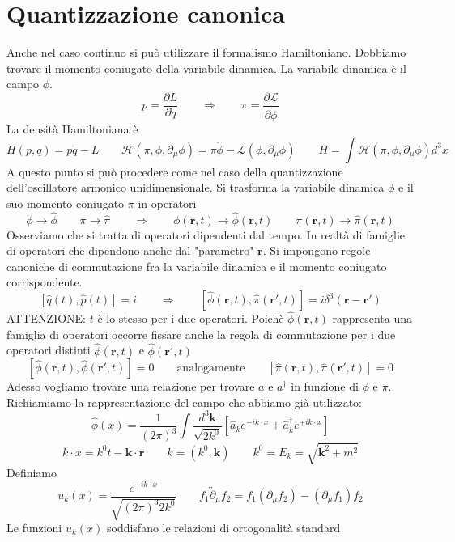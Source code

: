 \section{Quantizzazione canonica}
Anche nel caso continuo si può utilizzare il formalismo Hamiltoniano. Dobbiamo trovare il momento coniugato della variabile dinamica. La variabile dinamica è il campo $\phi$.
$$
p = \frac{\partial L}{\partial \dot{q}} \qquad \Longrightarrow \qquad \pi = \frac{\partial \mathcal{L}}{\partial \dot{\phi}}
$$
La densità Hamiltoniana è
$$
H(p,q) = p\dot{q} - L \qquad \mathcal{H}(\pi, \phi, \partial_\mu \phi) = \pi\dot{\phi} - \mathcal{L}(\phi, \partial_\mu \phi) \qquad H = \int \mathcal{H}(\pi, \phi, \partial_\mu \phi) d^3x
$$
A questo punto si può procedere come nel caso della quantizzazione dell'oscillatore armonico unidimensionale. Si trasforma la variabile dinamica $\phi$ e il suo momento coniugato $\pi$ in operatori
$$
\phi \to \hat{\phi} \qquad \pi \to \hat{\pi} \qquad \Longrightarrow \qquad \phi(\mathbf{r}, t) \to \hat{\phi}(\mathbf{r}, t) \qquad \pi(\mathbf{r}, t) \to \hat{\pi}(\mathbf{r}, t)
$$
Osserviamo che si tratta di operatori dipendenti dal tempo. In realtà di famiglie di operatori che dipendono anche dal "parametro" $\mathbf{r}$. Si impongono regole canoniche di commutazione fra la variabile dinamica e il momento coniugato corrispondente.
$$
[\hat{q}(t), \hat{p}(t)] = i \qquad \Longrightarrow \qquad [\hat{\phi}(\mathbf{r}, t), \hat{\pi}(\mathbf{r}', t)] = i\delta^3(\mathbf{r} - \mathbf{r}')
$$
ATTENZIONE: $t$ è lo stesso per i due operatori. Poichè $\hat{\phi}(\mathbf{r},t)$ rappresenta una famiglia di operatori occorre fissare anche la regola di commutazione per i due operatori distinti $\hat{\phi}(\mathbf{r},t)$ e $\hat{\phi}(\mathbf{r}',t)$
$$
[\hat{\phi}(\mathbf{r}, t), \hat{\phi}(\mathbf{r}', t)] = 0 \qquad \text{analogamente}\qquad [\hat{\pi}(\mathbf{r}, t), \hat{\pi}(\mathbf{r}', t)] = 0
$$
Adesso vogliamo trovare una relazione per trovare $a$ e $a^\dagger$ in funzione di $\phi$ e $\pi$. Richiamiamo la rappresentazione del campo che abbiamo già utilizzato:
$$
\hat{\phi}(x) = \frac{1}{(2\pi)^3} \int \frac{d^3\mathbf{k}}{\sqrt{2k^0}} [\hat{a}_k e^{-ik\cdot x} + \hat{a}_k^\dagger e^{+ik\cdot x}]
$$
$$
k \cdot x = k^0 t - \mathbf{k} \cdot \mathbf{r} \qquad k = (k^0, \mathbf{k}) \qquad k^0 = E_k = \sqrt{\mathbf{k}^2 + m^2}
$$
Definiamo
$$
u_k(x) = \frac{e^{-ik\cdot x}}{\sqrt{(2\pi)^3 2k^0}} \qquad f_1 \overleftrightarrow{\partial}_\mu f_2 = f_1 (\partial_\mu f_2) - (\partial_\mu f_1) f_2
$$
Le funzioni $u_k(x)$ soddisfano le relazioni di ortogonalità standard

